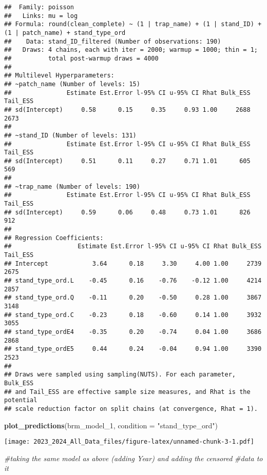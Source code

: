 \documentclass[
]{article}
\newenvironment{Shaded}{\begin{snugshade}}{\end{snugshade}}
\newcommand{\AttributeTok}[1]{\textcolor[rgb]{0.13,0.29,0.53}{#1}}
\newcommand{\CommentTok}[1]{\textcolor[rgb]{0.56,0.35,0.01}{\textit{#1}}}
\newcommand{\FunctionTok}[1]{\textcolor[rgb]{0.13,0.29,0.53}{\textbf{#1}}}
\newcommand{\NormalTok}[1]{#1}
\newcommand{\StringTok}[1]{\textcolor[rgb]{0.31,0.60,0.02}{#1}}
\begin{document}
\begin{verbatim}
##  Family: poisson 
##   Links: mu = log 
## Formula: round(clean_complete) ~ (1 | trap_name) + (1 | stand_ID) + (1 | patch_name) + stand_type_ord 
##    Data: stand_ID_filtered (Number of observations: 190) 
##   Draws: 4 chains, each with iter = 2000; warmup = 1000; thin = 1;
##          total post-warmup draws = 4000
## 
## Multilevel Hyperparameters:
## ~patch_name (Number of levels: 15) 
##               Estimate Est.Error l-95% CI u-95% CI Rhat Bulk_ESS Tail_ESS
## sd(Intercept)     0.58      0.15     0.35     0.93 1.00     2688     2673
## 
## ~stand_ID (Number of levels: 131) 
##               Estimate Est.Error l-95% CI u-95% CI Rhat Bulk_ESS Tail_ESS
## sd(Intercept)     0.51      0.11     0.27     0.71 1.01      605      569
## 
## ~trap_name (Number of levels: 190) 
##               Estimate Est.Error l-95% CI u-95% CI Rhat Bulk_ESS Tail_ESS
## sd(Intercept)     0.59      0.06     0.48     0.73 1.01      826      912
## 
## Regression Coefficients:
##                  Estimate Est.Error l-95% CI u-95% CI Rhat Bulk_ESS Tail_ESS
## Intercept            3.64      0.18     3.30     4.00 1.00     2739     2675
## stand_type_ord.L    -0.45      0.16    -0.76    -0.12 1.00     4214     2857
## stand_type_ord.Q    -0.11      0.20    -0.50     0.28 1.00     3867     3148
## stand_type_ord.C    -0.23      0.18    -0.60     0.14 1.00     3932     3055
## stand_type_ordE4    -0.35      0.20    -0.74     0.04 1.00     3686     2868
## stand_type_ordE5     0.44      0.24    -0.04     0.94 1.00     3390     2523
## 
## Draws were sampled using sampling(NUTS). For each parameter, Bulk_ESS
## and Tail_ESS are effective sample size measures, and Rhat is the potential
## scale reduction factor on split chains (at convergence, Rhat = 1).
\end{verbatim}

\begin{Shaded}
\begin{Highlighting}[]
\FunctionTok{plot\_predictions}\NormalTok{(brm\_model\_1, }\AttributeTok{condition =} \StringTok{"stand\_type\_ord"}\NormalTok{)}
\end{Highlighting}
\end{Shaded}

\texttt{[image: 2023\_2024\_All\_Data\_files/figure-latex/unnamed-chunk-3-1.pdf]}

\begin{Shaded}
\begin{Highlighting}[]
\CommentTok{\#taking the same model as above (adding \textquotesingle{}Year\textquotesingle{}) and adding the censored}
\CommentTok{\#data to it}
\end{Highlighting}
\end{Shaded}
\end{document}
